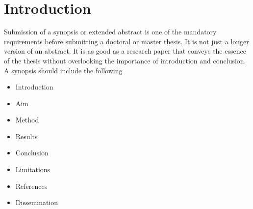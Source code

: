 \section{Introduction}\label{Guidelines}
Submission of a synopsis or extended abstract is one of the mandatory requirements before submitting a doctoral or master thesis. It is not just a longer version of an abstract. It is as good as a research paper that conveys the essence of the thesis without overlooking the importance of introduction and conclusion. A synopsis should include the following~\textemdash~
\begin{itemize}
	\item Introduction
	\item Aim
	\item Method
	\item Results
	\item Conclusion
	\item Limitations
	\item References
	\item Dissemination
\end{itemize}

